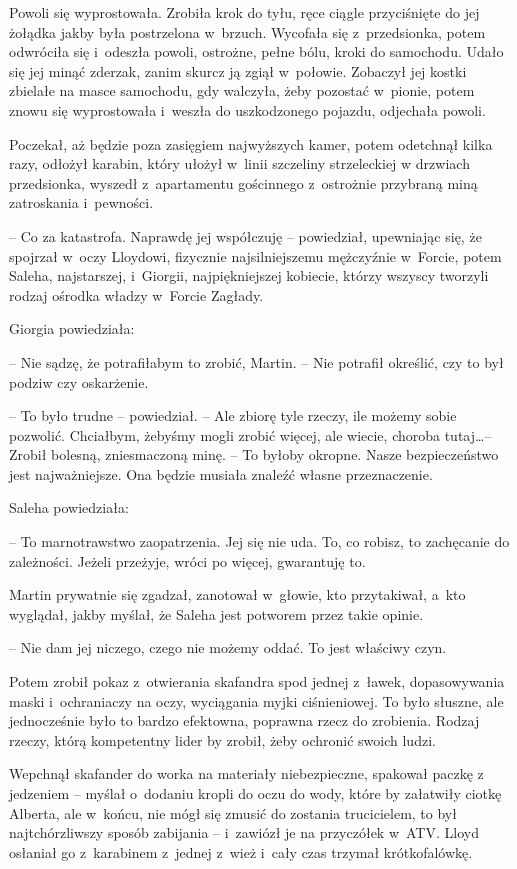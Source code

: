 \documentclass[oneside,polish,11pt,sfheadings]{mwbk}
\begin{document}
Powoli się wyprostowała. Zrobiła krok do tyłu, ręce ciągle przyciśnięte
do jej żołądka jakby była postrzelona w~brzuch. Wycofała się z~przedsionka, potem odwróciła się i~odeszła powoli, ostrożne, pełne bólu,
kroki do samochodu. Udało się jej minąć zderzak, zanim skurcz ją zgiął w~połowie. Zobaczył jej kostki zbielałe na masce samochodu, gdy walczyła,
żeby pozostać w~pionie, potem znowu się wyprostowała i~weszła do
uszkodzonego pojazdu, odjechała powoli.

Poczekał, aż będzie poza zasięgiem najwyższych kamer, potem odetchnął
kilka razy, odłożył karabin, który ułożył w~linii szczeliny strzeleckiej
w drzwiach przedsionka, wyszedł z~apartamentu gościnnego z~ostrożnie
przybraną miną zatroskania i~pewności.

-- Co za katastrofa. Naprawdę jej współczuję -- powiedział, upewniając
się, że spojrzał w~oczy Lloydowi, fizycznie najsilniejszemu mężczyźnie w~Forcie, potem Saleha, najstarszej, i~Giorgii, najpiękniejszej kobiecie,
którzy wszyscy tworzyli rodzaj ośrodka władzy w~Forcie Zagłady.

Giorgia powiedziała: 

-- Nie sądzę, że potrafiłabym to zrobić, Martin. -- Nie potrafił określić, czy to był podziw czy oskarżenie.

-- To było trudne -- powiedział. -- Ale zbiorę tyle rzeczy, ile możemy
sobie pozwolić. Chciałbym, żebyśmy mogli zrobić więcej, ale wiecie,
choroba tutaj\ldots  -- Zrobił bolesną, zniesmaczoną minę. -- To byłoby
okropne. Nasze bezpieczeństwo jest najważniejsze. Ona będzie musiała
znaleźć własne przeznaczenie.

Saleha powiedziała: 

-- To marnotrawstwo zaopatrzenia. Jej się nie uda.
To, co robisz, to zachęcanie do zależności. Jeżeli przeżyje, wróci po
więcej, gwarantuję to.

Martin prywatnie się zgadzał, zanotował w~głowie, kto przytakiwał, a~kto
wyglądał, jakby myślał, że Saleha jest potworem przez takie opinie.

-- Nie dam jej niczego, czego nie możemy oddać. To jest właściwy czyn.

Potem zrobił pokaz z~otwierania skafandra spod jednej z~ławek,
dopasowywania maski i~ochraniaczy na oczy, wyciągania myjki
ciśnieniowej. To było słuszne, ale jednocześnie było to bardzo
efektowna, poprawna rzecz do zrobienia. Rodzaj rzeczy, którą kompetentny
lider by zrobił, żeby ochronić swoich ludzi.

Wepchnął skafander do worka na materiały niebezpieczne, spakował paczkę
z jedzeniem -- myślał o~dodaniu kropli do oczu do wody, które by
załatwiły ciotkę Alberta, ale w~końcu, nie mógł się zmusić do zostania
trucicielem, to był najtchórzliwszy sposób zabijania -- i~zawiózł je na
przyczółek w~ATV. Lloyd osłaniał go z~karabinem z~jednej z~wież i~cały
czas trzymał krótkofalówkę.
\end{document}
